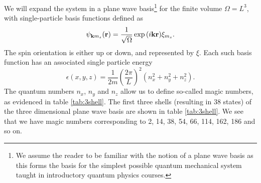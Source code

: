 We will expand the system in a plane wave basis\footnote{We assume the
  reader to be familiar with the notion of a plane wave basis as this
  forms the basis for the simplest possible quantum mechanical system
  taught in introductory quantum physics courses.} for the finite
volume $\Omega = L^3$, with single-particle basis functions defined as
\begin{equation}
\psi_{{\bf k}m_s}({\bf r})= \frac{1}{\sqrt{\Omega}}\exp{(i{\bf kr})}\xi_{m_s}.
\end{equation}
The spin orientation is either up or down, and represented by $\xi$.
Each such basis function has an associated single particle energy
\begin{equation}
\epsilon(x,y,z) = \frac{1}{2m} (\frac{2\pi}{L})^2 (n_x^2 +n_y^2 + n_z^2).
\end{equation}
The quantum numbers $n_x$, $n_y$ and $n_z$ allow us to define
so-called magic numbers, as evidenced in table \ref{tab:3shell}.  The
first three shells (resulting in 38 states) of the three dimensional
plane wave basis are shown in table \ref{tab:3shell}. We see that we
have magic numbers corresponding to 2, 14, 38, 54, 66, 114, 162, 186
and so on.


